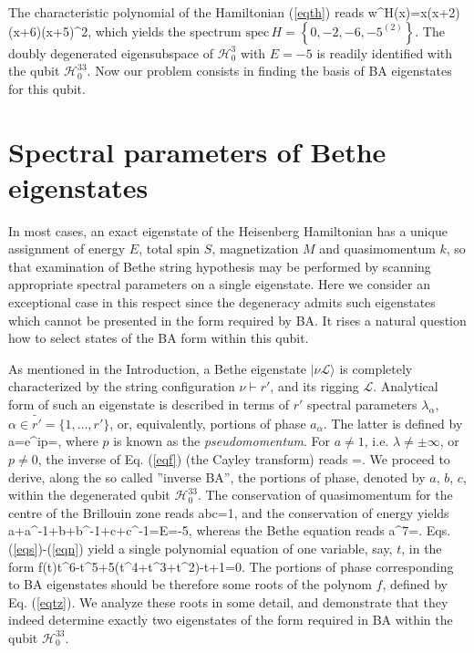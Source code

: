 \documentclass{elsarticle}
\begin{document}
The characteristic polynomial of the Hamiltonian (\ref{eqth}) reads
\be
w^H(x)=x(x+2)(x+6)(x+5)^2,
\ee
which yields the spectrum $\mathrm{spec\, }H=\left\{0,-2,-6,-5^{(2)}\right\}$. The doubly degenerated eigensubspace of $\mathcal{H}^3_0$ with $E=-5$ is readily identified with the qubit $\mathcal{H}^{33}_0$. Now our problem consists in finding the basis of BA eigenstates for this qubit. 


\section{Spectral parameters of Bethe eigenstates}
In most cases, an exact eigenstate of the Heisenberg Hamiltonian has \linebreak  a unique assignment of energy $E$, total spin $S$, magnetization $M$ and quasimomentum $k$, so that examination of Bethe string hypothesis may be performed by scanning appropriate spectral parameters on a single eigenstate. Here we consider an exceptional case in this respect since the degeneracy admits such eigenstates which cannot be presented in the form required by BA. It rises a natural question how to select states of the BA form within this qubit.

As mentioned in the Introduction, a Bethe eigenstate $|\nu\mathcal{L}\rangle$ is completely characterized by the string configuration $\nu\vdash r'$, and its rigging $\mathcal{L}$. Analytical form of such an eigenstate is described in terms of $r'$ spectral parameters $\lambda_{\alpha}$, $\alpha\in \tilde{r'}=\{1,\ldots,r'\}$, or, equivalently, portions of phase $a_{\alpha}$. The latter is defined by
\be
\label{eqf}
a=e^{ip}=,
\ee
where $p$ is known as the {\em pseudomomentum}. For $a\neq 1$, i.e. $\lambda\neq\pm\infty$, or $p\neq 0$, the inverse of Eq. (\ref{eqf}) (the Cayley transform) reads
\be
\label{eqjacobi}
\lambda=.
\ee
We proceed to derive, along the so called ''inverse BA'', the portions of phase, denoted by $a$, $b$, $c$, within the degenerated qubit $\mathcal{H}^{33}_0$. The conservation of quasimomentum for the centre of the Brillouin zone reads
\be
\label{eqs}
abc=1,
\ee
and the conservation of energy yields
\be
a+a^{-1}+b+b^{-1}+c+c^{-1}=E=-5,
\ee
whereas the Bethe equation reads 
\be
\label{eqn}
a^7=.
\ee
Eqs. (\ref{eqs})-(\ref{eqn}) yield a single polynomial equation of one variable, say, $t$, in the form
\be
\label{eqtz}
f(t)\equiv t^6-t^5+5(t^4+t^3+t^2)-t+1=0.
\ee
The portions of phase corresponding to BA eigenstates should be therefore some roots of the polynom $f$, defined by Eq. (\ref{eqtz}). We analyze these roots in some detail, and demonstrate that they indeed determine exactly two eigenstates of the form required in BA within the qubit $\mathcal{H}^{33}_0$.
\end{document}
